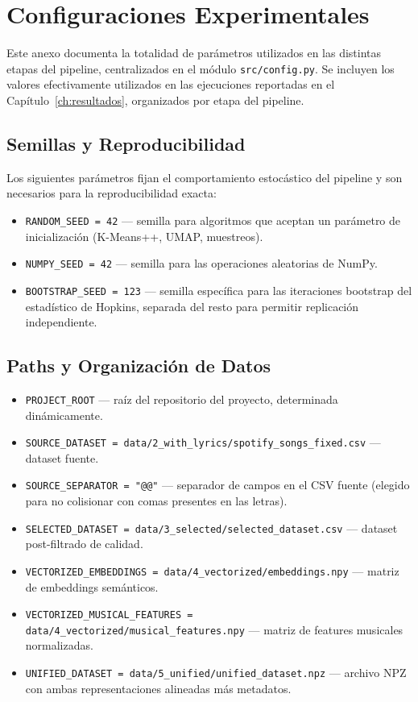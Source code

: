 \chapter{Configuraciones Experimentales}
\label{app:configuraciones}

Este anexo documenta la totalidad de parámetros utilizados en las distintas etapas del pipeline, centralizados en el módulo \texttt{src/config.py}. Se incluyen los valores efectivamente utilizados en las ejecuciones reportadas en el Capítulo~\ref{ch:resultados}, organizados por etapa del pipeline.

\section{Semillas y Reproducibilidad}

Los siguientes parámetros fijan el comportamiento estocástico del pipeline y son necesarios para la reproducibilidad exacta:

\begin{itemize}[leftmargin=2em]
    \item \texttt{RANDOM\_SEED = 42} --- semilla para algoritmos que aceptan un parámetro de inicialización (K-Means++, UMAP, muestreos).
    \item \texttt{NUMPY\_SEED = 42} --- semilla para las operaciones aleatorias de NumPy.
    \item \texttt{BOOTSTRAP\_SEED = 123} --- semilla específica para las iteraciones bootstrap del estadístico de Hopkins, separada del resto para permitir replicación independiente.
\end{itemize}

\section{Paths y Organización de Datos}

\begin{itemize}[leftmargin=2em]
    \item \texttt{PROJECT\_ROOT} --- raíz del repositorio del proyecto, determinada dinámicamente.
    \item \texttt{SOURCE\_DATASET = data/2\_with\_lyrics/spotify\_songs\_fixed.csv} --- dataset fuente.
    \item \texttt{SOURCE\_SEPARATOR = "@@"} --- separador de campos en el CSV fuente (elegido para no colisionar con comas presentes en las letras).
    \item \texttt{SELECTED\_DATASET = data/3\_selected/selected\_dataset.csv} --- dataset post-filtrado de calidad.
    \item \texttt{VECTORIZED\_EMBEDDINGS = data/4\_vectorized/embeddings.npy} --- matriz de embeddings semánticos.
    \item \texttt{VECTORIZED\_MUSICAL\_FEATURES = data/4\_vectorized/musical\_features.npy} --- matriz de features musicales normalizadas.
    \item \texttt{UNIFIED\_DATASET = data/5\_unified/unified\_dataset.npz} --- archivo NPZ con ambas representaciones alineadas más metadatos.
\end{itemize}

